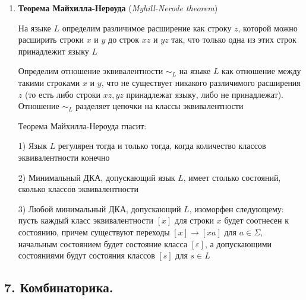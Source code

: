 \documentclass[12pt]{article}
\begin{document}
\begin{enumerate}
\begin{minipage}{\linewidth}
            Пусть даны автоматы $M = (Q_1, \Sigma, \delta_1, q_1, F_1)$ и $N = (Q_2, \Sigma, \delta_2, q_2, F_2)$.

            Теперь построим такой автомат $A = (Q, \Sigma, \delta, q_1, F)$, выбрав какое-либо начальное состояние, объединив множества состояний и множества допускающих состояний и расширив функцию переходов

            Автоматы $M$ и $N$ эквивалентны, если состояния $q_1$ и $q_2$ принадлежат одному классу эквивалентности, то есть $q_1 \, R \, q_2$

        \end{minipage}

        \smallvspace

        \item \textbf{Теорема Майхилла-Нероуда} (\textit{Myhill-Nerode theorem})

        На языке $L$ определим различимое расширение как строку $z$, которой можно расширить строки $x$ и $y$ до строк $xz$ и $yz$ так, что
        только одна из этих строк принадлежит языку $L$

        Определим отношение эквивалентности $\sim_L$ на языке $L$ как отношение между такими строками $x$ и $y$,
        что не существует никакого различимого расширения $z$ (то есть либо строки $xz, yz$ принадлежат языку, либо не принадлежат).
        Отношение $\sim_L$ разделяет цепочки на классы эквивалентности

        Теорема Майхилла-Нероуда гласит:

        1) Язык $L$ регулярен тогда и только тогда, когда количество классов эквивалентности конечно

        2) Минимальный ДКА, допускающий язык $L$, имеет столько состояний, сколько классов эквивалентности

        3) Любой минимальный ДКА, допускающий $L$, изоморфен следующему:
        пусть каждый класс эквивалентности $[x]$ для строки $x$ будет соотнесен к состоянию, причем существуют переходы $[x] \to [xa]$ для $a \in \Sigma$,
        начальным состоянием будет состояние класса $[\varepsilon]$, а допускающими состояниями будут состояния классов $[s]$ для $s \in L$


    \end{enumerate}

    \subsection{7. Комбинаторика.}
\end{document}
